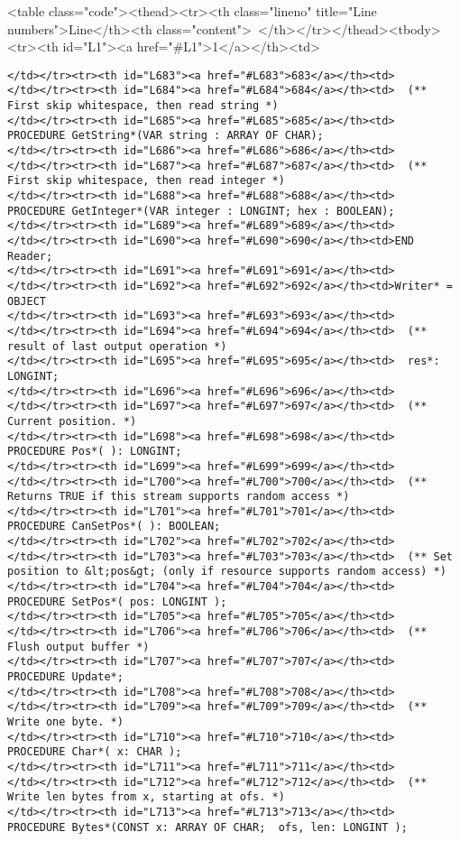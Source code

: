 <table class="code"><thead><tr><th class="lineno" title="Line numbers">Line</th><th class="content"> </th></tr></thead><tbody><tr><th id="L1"><a href="#L1">1</a></th><td>\documentclass[a4paper,11pt]{article}
\begin{document}
\begin{lstlisting}[language=Oberon,frame=none,caption={Simplified Reader and Writer Interface}]
</td></tr><tr><th id="L683"><a href="#L683">683</a></th><td>
</td></tr><tr><th id="L684"><a href="#L684">684</a></th><td>  (** First skip whitespace, then read string *)
</td></tr><tr><th id="L685"><a href="#L685">685</a></th><td>  PROCEDURE GetString*(VAR string : ARRAY OF CHAR);
</td></tr><tr><th id="L686"><a href="#L686">686</a></th><td>
</td></tr><tr><th id="L687"><a href="#L687">687</a></th><td>  (** First skip whitespace, then read integer *)
</td></tr><tr><th id="L688"><a href="#L688">688</a></th><td>  PROCEDURE GetInteger*(VAR integer : LONGINT; hex : BOOLEAN);
</td></tr><tr><th id="L689"><a href="#L689">689</a></th><td>
</td></tr><tr><th id="L690"><a href="#L690">690</a></th><td>END Reader;
</td></tr><tr><th id="L691"><a href="#L691">691</a></th><td>
</td></tr><tr><th id="L692"><a href="#L692">692</a></th><td>Writer* = OBJECT
</td></tr><tr><th id="L693"><a href="#L693">693</a></th><td>
</td></tr><tr><th id="L694"><a href="#L694">694</a></th><td>  (** result of last output operation *)
</td></tr><tr><th id="L695"><a href="#L695">695</a></th><td>  res*: LONGINT;
</td></tr><tr><th id="L696"><a href="#L696">696</a></th><td>
</td></tr><tr><th id="L697"><a href="#L697">697</a></th><td>  (** Current position. *)
</td></tr><tr><th id="L698"><a href="#L698">698</a></th><td>  PROCEDURE Pos*( ): LONGINT;
</td></tr><tr><th id="L699"><a href="#L699">699</a></th><td>
</td></tr><tr><th id="L700"><a href="#L700">700</a></th><td>  (** Returns TRUE if this stream supports random access *)
</td></tr><tr><th id="L701"><a href="#L701">701</a></th><td>  PROCEDURE CanSetPos*( ): BOOLEAN;
</td></tr><tr><th id="L702"><a href="#L702">702</a></th><td>
</td></tr><tr><th id="L703"><a href="#L703">703</a></th><td>  (** Set position to &lt;pos&gt; (only if resource supports random access) *)
</td></tr><tr><th id="L704"><a href="#L704">704</a></th><td>  PROCEDURE SetPos*( pos: LONGINT );
</td></tr><tr><th id="L705"><a href="#L705">705</a></th><td>
</td></tr><tr><th id="L706"><a href="#L706">706</a></th><td>  (** Flush output buffer *)
</td></tr><tr><th id="L707"><a href="#L707">707</a></th><td>  PROCEDURE Update*;
</td></tr><tr><th id="L708"><a href="#L708">708</a></th><td>
</td></tr><tr><th id="L709"><a href="#L709">709</a></th><td>  (** Write one byte. *)
</td></tr><tr><th id="L710"><a href="#L710">710</a></th><td>  PROCEDURE Char*( x: CHAR );
</td></tr><tr><th id="L711"><a href="#L711">711</a></th><td>
</td></tr><tr><th id="L712"><a href="#L712">712</a></th><td>  (** Write len bytes from x, starting at ofs. *)
</td></tr><tr><th id="L713"><a href="#L713">713</a></th><td>  PROCEDURE Bytes*(CONST x: ARRAY OF CHAR;  ofs, len: LONGINT );

\end{lstlisting}
\end{document}
